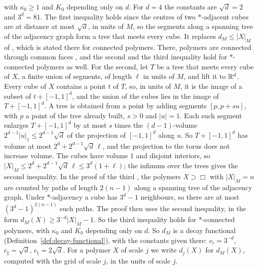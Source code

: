 with $\kappa_0\ge1$ and $K_0$ depending only on $d$. For $d=4$ the constants are $\sqrt d=2$ and $3^d=81$. The first inequality holds since the centres of two $*$-adjacent cubes are at distance at most $\sqrt d$, in units of $M$, so the segments along a spanning tree of the adjacency graph form a tree that meets every cube. It replaces $d_M\le|X|_M$ of \cite{DimockI}, which is stated there for connected polymers. There, polymers are connected through common faces \cite[Sect.~3.1]{DimockI}, and the second and the third inequality hold for $*$-connected polymers as well. For the second, let $T$ be a tree that meets every cube of $X$, a finite union of segments, of length $\ell$ in units of $M$, and lift it to $\mathbb R^d$. Every cube of $X$ contains a point $t$ of $T$, so, in units of $M$, it is the image of a subset of $t+[-1,1]^d$, and the union of the cubes lies in the image of $T+[-1,1]^d$. A tree is obtained from a point by adding segments $[p,p+su]$, with $p$ a point of the tree already built, $s>0$ and $|u|=1$. Each such segment enlarges $T+[-1,1]^d$ by at most $s$ times the $(d-1)$-volume $2^{d-1}|u|_1\le2^{d-1}\sqrt d$ of the projection of $[-1,1]^d$ along $u$. So $T+[-1,1]^d$ has volume at most $2^d+2^{d-1}\sqrt d\,\ell$, and the projection to the torus does not increase volume. The cubes have volume $1$ and disjoint interiors, so $|X|_M\le2^d+2^{d-1}\sqrt d\,\ell\le3^d(1+\ell)$; the infimum over the trees gives the second inequality. In the proof of the third \cite[Lemma~25]{DimockI}, the polymers $X\supset\Box$ with $|X|_M=n$ are counted by paths of length $2(n-1)$ along a spanning tree of the adjacency graph. Under $*$-adjacency a cube has $3^d-1$ neighbours, so there are at most $(3^d-1)^{2(n-1)}$ such paths. The proof then uses the second inequality, in the form $d_M(X)\ge3^{-d}|X|_M-1$. So the third inequality holds for $*$-connected polymers, with $\kappa_0$ and $K_0$ depending only on $d$. So $d_M$ is a decay functional (Definition~\ref{def:decay-functional}), with the constants given there: $c_\flat=3^{-d}$, $c_\sharp=\sqrt d$, $c_\natural=2\sqrt d$. For a polymer $X$ of scale $j$ we write $d_j(X)$ for $d_M(X)$, computed with the grid of scale $j$, in the units of scale $j$.

